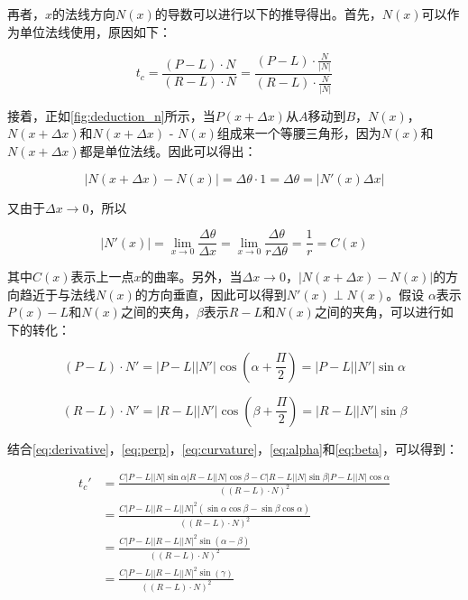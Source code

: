 再者，$x$的法线方向$N(x)$的导数可以进行以下的推导得出。首先，$N(x)$可以作为单位法线使用，原因如下：

\begin{equation}
    t_c = \frac{(P-L)\cdot{N}}{(R-L)\cdot{N}} = \frac{(P-L)\cdot{\frac{N}{|N|}}}{(R-L)\cdot{\frac{N}{|N|}}}
\end{equation}

接着，正如\autoref{fig:deduction_n}所示，当$P(x+\Delta x)$从$A$移动到$B$，$N(x)$，$N(x+\Delta x)$和$N(x+\Delta x)$ - $N(x)$组成来一个等腰三角形，因为$N(x)$和$N(x+\Delta x)$都是单位法线。因此可以得出：

\begin{equation}
    |N(x+\Delta x) - N(x)| = \Delta\theta \cdot 1 = \Delta\theta = |N'(x)\Delta x|
\end{equation}

又由于$\Delta x \to 0$，所以

\begin{equation}\label{eq:curvature}
    |N'(x)| = \lim_{x \to 0}\frac{\Delta\theta}{\Delta x} = \lim_{x \to 0}\frac{\Delta\theta}{r\Delta\theta} = \frac{1}{r} = C(x)
\end{equation}

其中$C(x)$表示\ec{}上一点$x$的曲率。另外，当$\Delta x \to 0$，$|N(x+\Delta x) - N(x)|$的方向趋近于与法线$N(x)$的方向垂直，因此可以得到$N'(x) \perp N(x)$。假设 $\alpha$表示$P(x)-L$和$N(x)$之间的夹角，$\beta$表示$R-L$和$N(x)$之间的夹角，可以进行如下的转化：

\begin{equation}\label{eq:alpha}
(P-L)\cdot{N'} = |P-L|{|N'|}\cos{(\alpha+\frac{\Pi}{2})} = |P-L|{|N'|}\sin\alpha
\end{equation}

\begin{equation}\label{eq:beta}
(R-L)\cdot{N'} = |R-L|{|N'|}\cos{(\beta+\frac{\Pi}{2})} = |R-L|{|N'|}\sin\beta
\end{equation}

结合\autoref{eq:derivative}，\autoref{eq:perp}，\autoref{eq:curvature}，\autoref{eq:alpha}和\ref{eq:beta}，可以得到：

\begin{equation}\label{eq:final}
\begin{split}
t_c' & = \frac{C|P-L||N|\sin\alpha|R-L||N|\cos\beta-C|R-L||N|\sin\beta|P-L||N|\cos\alpha}{((R-L)\cdot{N})^2} \\
& = \frac{C|P-L||R-L||N|^2(\sin\alpha\cos\beta-\sin\beta\cos\alpha)}{((R-L)\cdot{N})^2} \\
& = \frac{C|P-L||R-L||N|^2\sin(\alpha-\beta)}{((R-L)\cdot{N})^2} \\
& = \frac{C|P-L||R-L||N|^2\sin(\gamma)}{((R-L)\cdot{N})^2}
\end{split}
\end{equation}

